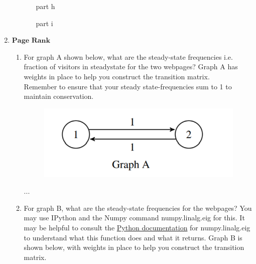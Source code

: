 \documentclass[11pt]{article}
\begin{document}
\begin{enumerate}
\begin{enumerate}
\begin{enumerate}[(a)]
	      		
	      		\newpage
	      	    \begin{Answer}
	      	            part h
	      	    \end{Answer}
	      	    
	      	    \newpage
	      	    \begin{Answer}
	      	            part i
	      	    \end{Answer}
	      	    
	      	\end{enumerate}

	      	
	      	
	      		\end{enumerate}
	      			      		   
	      		
	      			      		   
	      		\newpage
	      		\item $\textbf{Page Rank}$
	      		
	      		\begin{enumerate}
	      			\item For graph A shown below, what are the steady-state frequencies i.e. fraction of visitors in steadystate for the two webpages? Graph A has weights in place to help you construct the transition matrix.\\Remember to ensure that your steady state-frequencies sum to 1 to maintain conservation. 
	      			\begin{figure}[h]
                        \centering
                        \includegraphics[scale=0.9]{q9a}
                    \end{figure}
	      			\begin{Answer}
	      				...
	      			\end{Answer}


                    \newpage
	      			\item For graph B, what are the steady-state frequencies for the webpages? You may use IPython and the Numpy command numpy.linalg.eig for this. It may be helpful to consult the \href{https://numpy.org/doc/stable/reference/generated/numpy.linalg.eig.html}{Python documentation} for numpy.linalg.eig to understand what this function does and what it returns. Graph B is shown below, with weights in place to help you construct the transition matrix.
	      			

\end{enumerate}
\end{enumerate}
\end{document}

